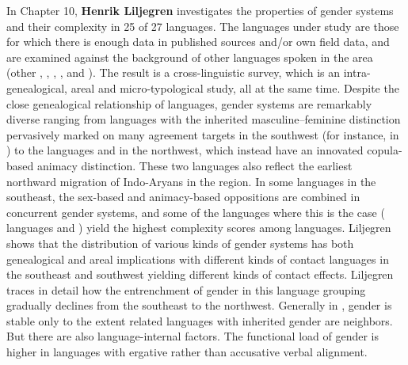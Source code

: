 \documentclass[output=collectionpaper]{langsci/langscibook}
\begin{document}
In Chapter 10, \textbf{Henrik Liljegren} investigates the properties of gender systems and their complexity in 25 of 27  languages. The languages under study are those for which there is enough data in published sources and/or own field data, and are examined against the background of other languages spoken in the area (other , , , ,  and ). The result is a cross-linguistic survey, which is an intra-genealogical, areal and micro-typological study, all at the same time. Despite the close genealogical relationship of  languages, gender systems are remarkably diverse ranging from languages with the inherited masculine–feminine distinction pervasively marked on many agreement targets in the southwest (for instance, in ) to the  languages  and  in the northwest, which instead have an innovated copula-based animacy distinction. These two languages also reflect the earliest northward migration of Indo-Aryans in the region. In some languages in the southeast, the sex-based and animacy-based oppositions are combined in concurrent gender systems, and some of the languages where this is the case ( languages and ) yield the highest complexity scores among  languages. Liljegren shows that the distribution of various kinds of gender systems has both genealogical and areal implications with different kinds of  contact languages in the southeast and southwest yielding different kinds of contact effects. Liljegren traces in detail how the entrenchment of gender in this language grouping gradually declines from the southeast to the northwest. Generally in , gender is stable only to the extent related languages with inherited gender are neighbors. But there are also language-internal factors. The functional load of gender is higher in languages with ergative rather than accusative verbal alignment.
\end{document}
